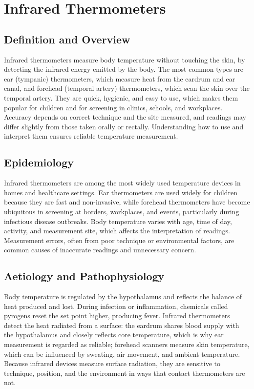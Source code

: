 \chapter{Infrared Thermometers}

\section*{Definition and Overview}
Infrared thermometers measure body temperature without touching the skin, by detecting the infrared energy emitted by the body. The most common types are ear (tympanic) thermometers, which measure heat from the eardrum and ear canal, and forehead (temporal artery) thermometers, which scan the skin over the temporal artery. They are quick, hygienic, and easy to use, which makes them popular for children and for screening in clinics, schools, and workplaces. Accuracy depends on correct technique and the site measured, and readings may differ slightly from those taken orally or rectally. Understanding how to use and interpret them ensures reliable temperature measurement.

\section*{Epidemiology}
Infrared thermometers are among the most widely used temperature devices in homes and healthcare settings. Ear thermometers are used widely for children because they are fast and non-invasive, while forehead thermometers have become ubiquitous in screening at borders, workplaces, and events, particularly during infectious disease outbreaks. Body temperature varies with age, time of day, activity, and measurement site, which affects the interpretation of readings. Measurement errors, often from poor technique or environmental factors, are common causes of inaccurate readings and unnecessary concern.

\section*{Aetiology and Pathophysiology}
Body temperature is regulated by the hypothalamus and reflects the balance of heat produced and lost. During infection or inflammation, chemicals called pyrogens reset the set point higher, producing fever. Infrared thermometers detect the heat radiated from a surface: the eardrum shares blood supply with the hypothalamus and closely reflects core temperature, which is why ear measurement is regarded as reliable; forehead scanners measure skin temperature, which can be influenced by sweating, air movement, and ambient temperature. Because infrared devices measure surface radiation, they are sensitive to technique, position, and the environment in ways that contact thermometers are not.

